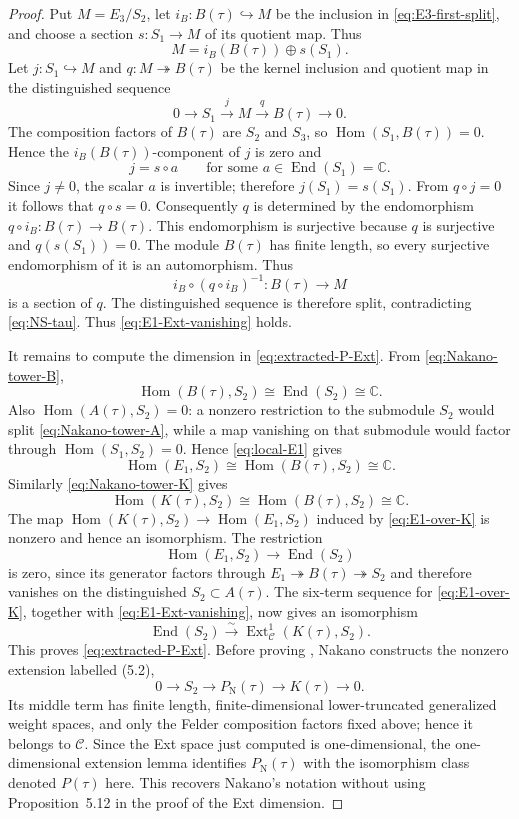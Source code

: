 \documentclass[12pt,leqno]{amsart}
\numberwithin{equation}{section}
\newcommand{\End}{\operatorname{End}}
\newcommand{\Hom}{\operatorname{Hom}}
\newcommand{\Ext}{\operatorname{Ext}}
\def\C{\mathbb{C}}
\begin{document}
\begin{proof}
Put $M=E_3/S_2$, let $i_B:B(\tau)\hookrightarrow M$ be the inclusion in
\eqref{eq:E3-first-split}, and choose a section
$s:S_1\to M$ of its quotient map.  Thus
\[
 M=i_B(B(\tau))\oplus s(S_1).
\]
Let $j:S_1\hookrightarrow M$ and $q:M\twoheadrightarrow B(\tau)$ be the
kernel inclusion and quotient map in the distinguished sequence
\[
 0\longrightarrow S_1\xrightarrow{\ j\ }M
 \xrightarrow{\ q\ }B(\tau)\longrightarrow0.
\]
The composition factors of $B(\tau)$ are $S_2$ and $S_3$, so
$\Hom(S_1,B(\tau))=0$.  Hence the $i_B(B(\tau))$-component of $j$ is
zero and
\[
 j=s\circ a
 \qquad\text{for some }a\in\End(S_1)=\C.
\]
Since $j\ne0$, the scalar $a$ is invertible; therefore
$j(S_1)=s(S_1)$.  From $q\circ j=0$ it follows that $q\circ s=0$.
Consequently $q$ is determined by the endomorphism
$q\circ i_B:B(\tau)\to B(\tau)$.  This endomorphism is surjective because
$q$ is surjective and $q(s(S_1))=0$.  The module $B(\tau)$ has finite
length, so every surjective endomorphism of it is an automorphism.  Thus
\[
 i_B\circ(q\circ i_B)^{-1}:B(\tau)\longrightarrow M
\]
is a section of $q$.  The distinguished sequence is therefore split,
contradicting \eqref{eq:NS-tau}.  Thus \eqref{eq:E1-Ext-vanishing} holds.

It remains to compute the dimension in
\eqref{eq:extracted-P-Ext}.  From
\eqref{eq:Nakano-tower-B},
\[
 \Hom(B(\tau),S_2)\cong\End(S_2)\cong\C.
\]
Also $\Hom(A(\tau),S_2)=0$: a nonzero restriction to the submodule
$S_2$ would split \eqref{eq:Nakano-tower-A}, while a map vanishing on
that submodule would factor through
$\Hom(S_1,S_2)=0$.  Hence \eqref{eq:local-E1} gives
\[
 \Hom(E_1,S_2)\cong\Hom(B(\tau),S_2)\cong\C.
\]
Similarly \eqref{eq:Nakano-tower-K} gives
\[
 \Hom(K(\tau),S_2)\cong\Hom(B(\tau),S_2)\cong\C.
\]
The map
$\Hom(K(\tau),S_2)\to\Hom(E_1,S_2)$ induced by
\eqref{eq:E1-over-K} is nonzero and hence an isomorphism.  The
restriction
\[
 \Hom(E_1,S_2)\longrightarrow\End(S_2)
\]
is zero, since its generator factors through
$E_1\twoheadrightarrow B(\tau)\twoheadrightarrow S_2$ and therefore
vanishes on the distinguished $S_2\subset A(\tau)$.  The six-term
sequence for \eqref{eq:E1-over-K}, together with
\eqref{eq:E1-Ext-vanishing}, now gives an isomorphism
\[
 \End(S_2)\xrightarrow{\ \sim\ }
 \Ext^1_{\mathscr C}(K(\tau),S_2).
\]
This proves \eqref{eq:extracted-P-Ext}.  Before proving
\cite[Proposition~5.12]{Nakano}, Nakano constructs the nonzero extension
labelled (5.2),
\[
 0\longrightarrow S_2\longrightarrow P_{\mathrm N}(\tau)
 \longrightarrow K(\tau)\longrightarrow0.
\]
Its middle term has finite length, finite-dimensional lower-truncated
generalized weight spaces, and only the Felder composition factors fixed
above; hence it belongs to $\mathscr C$.  Since the Ext space just computed is
one-dimensional, the one-dimensional extension lemma identifies
$P_{\mathrm N}(\tau)$ with the isomorphism class denoted $P(\tau)$ here.  This recovers Nakano's notation without using
Proposition~5.12 in the proof of the Ext dimension.
\end{proof}
\end{document}
